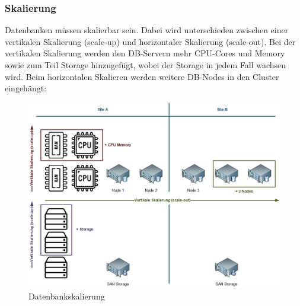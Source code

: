 
\subsubsection{Skalierung}
Datenbanken müssen skalierbar sein.
Dabei wird unterschieden zwischen einer vertikalen Skalierung (scale-up) und horizontaler Skalierung (scale-out).
Bei der vertikalen Skalierung werden den DB-Servern mehr CPU-Cores und Memory sowie zum Teil Storage hinzugefügt, wobei der Storage in jedem Fall wachsen wird.
Beim horizontalen Skalieren werden weitere DB-Nodes in den Cluster eingehängt\cite{IZSGZLVT}:
\begin{figure}[H]
    \centering
    \includegraphics[width=1\linewidth]{source/implementation/evaluation/Skalierung}
    \caption{Datenbankskalierung}
    \label{fig:Datenbankskalierung}
\end{figure}